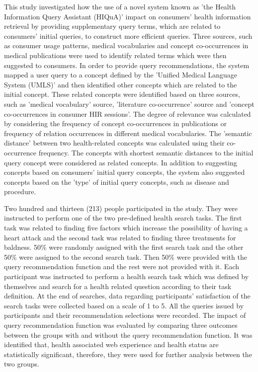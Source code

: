 \documentclass[]{article}
\begin{document}
This study investigated how the use of a novel system known as 'the  Health Information Query Assistant (HIQuA)' impact on consumers' health information retrieval by providing supplementary query terms, which are related to consumers' initial queries, to construct more efficient queries. Three sources, such as consumer usage patterns, medical vocabularies and concept co-occurrences in medical publications were used to identify related terms which were then suggested to consumers. In order to provide query recommendations, the system mapped a user query to a concept defined by the 'Unified Medical Language System (UMLS)' and then identified other concepts which are related to the initial concept. These related concepts were identified based on three sources, such as 'medical vocabulary' source, 'literature co-occurrence' source and 'concept co-occurrences in consumer HIR sessions'. The degree of relevance was calculated by considering the frequency of concept co-occurrences in publications or frequency of relation occurrences in different medical vocabularies. The 'semantic distance' between two health-related concepts was calculated using their co-occurrence frequency. The concepts with shortest semantic distances to the initial query concept were considered as related concepts. In addition to suggesting concepts based on consumers' initial query concepts, the system also suggested concepts based on the 'type' of initial query concepts, such as disease and procedure.      

Two hundred and thirteen (213) people participated in the study. They were instructed to perform one of the two pre-defined health search tasks. The first task was related to finding five factors which increase the possibility of having a heart attack and the second task was related to finding three treatments for baldness. 50\% were randomly assigned with the first search task and the other 50\% were assigned to the second search task. Then 50\% were provided with the query recommendation function and the rest were not provided with it. Each participant was instructed to perform a health search task which was defined by themselves and search for a health related question according to their task definition. At the end of searches, data regarding participants' satisfaction of the search tasks were collected based on a scale of 1 to 5. All the queries issued by participants and their recommendation selections were recorded. The impact of query recommendation function was evaluated by comparing three outcomes between the groups with and without the query recommendation function. It was identified that, health associated web experience and health status are statistically significant, therefore, they were used for further analysis between the two groups.
\end{document}
